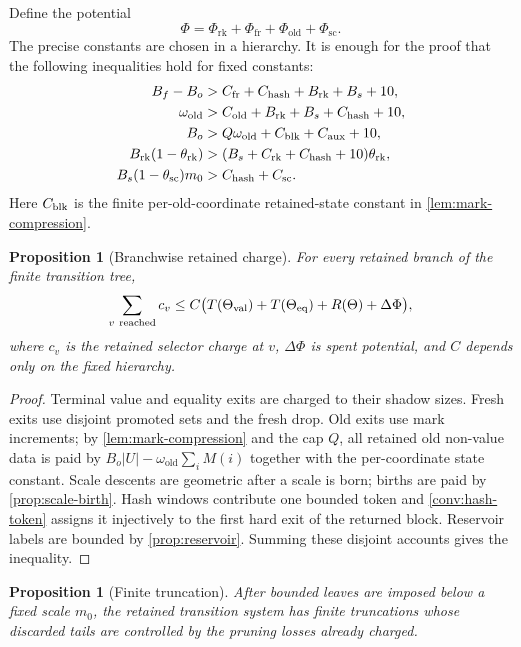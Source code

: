 \documentclass[11pt]{article}
\newcommand{\Cref}[1]{\ref{#1}}
\newtheorem{proposition}[theorem]{Proposition}
\theoremstyle{remark}
\newcommand{\old}{\mathrm{old}}
\newcommand{\fr}{\mathrm{fr}}
\newcommand{\scal}{\mathrm{sc}}
\newcommand{\rk}{\mathrm{rk}}
\begin{document}
Define the potential
\[
        \Phi=\Phi_{\rk}+\Phi_{\fr}+\Phi_{\old}+\Phi_{\scal}.
\]
The precise constants are chosen in a hierarchy.  It is enough for the proof that the following inequalities hold for fixed constants:
\begin{align*}
        B_f-B_o &> C_{\fr}+C_{\rm hash}+B_{\rk}+B_s+10,\\
        \omega_{\old} &> C_{\old}+B_{\rk}+B_s+C_{\rm hash}+10,\\
        B_o &> Q\omega_{\old}+C_{\rm blk}+C_{\rm aux}+10,\\
        B_{\rk}(1-\theta_{\rk}) &> (B_s+C_{\rk}+C_{\rm hash}+10)\theta_{\rk},\\
        B_s(1-\theta_{\scal})m_0 &> C_{\rm hash}+C_{\scal}.
\end{align*}
Here $C_{\rm blk}$ is the finite per-old-coordinate retained-state constant in \Cref{lem:mark-compression}.

\begin{proposition}[Branchwise retained charge]\label{prop:branch-charge}
For every retained branch of the finite transition tree,
\[
        \sum_{v\ {\rm reached}} c_v
        \le C\bigl(T(\Theta_{\rm val})+T(\Theta_{\rm eq})+R(\Theta)+\Delta\Phi\bigr),
\]
where $c_v$ is the retained selector charge at $v$, $\Delta\Phi$ is spent potential, and $C$ depends only on the fixed hierarchy.
\end{proposition}

\begin{proof}
Terminal value and equality exits are charged to their shadow sizes.  Fresh exits use disjoint promoted sets and the fresh drop.  Old exits use mark increments; by \Cref{lem:mark-compression} and the cap $Q$, all retained old non-value data is paid by $B_o|U|-\omega_{\old}\sum_i M(i)$ together with the per-coordinate state constant.  Scale descents are geometric after a scale is born; births are paid by \Cref{prop:scale-birth}.  Hash windows contribute one bounded token and \Cref{conv:hash-token} assigns it injectively to the first hard exit of the returned block.  Reservoir labels are bounded by \Cref{prop:reservoir}.  Summing these disjoint accounts gives the inequality.
\end{proof}

\begin{proposition}[Finite truncation]\label{prop:finite-truncation}
After bounded leaves are imposed below a fixed scale $m_0$, the retained transition system has finite truncations whose discarded tails are controlled by the pruning losses already charged.
\end{proposition}
\end{document}
